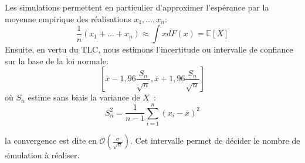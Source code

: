%
%	
%	
%	
%	
%	
%	
%	
%	
%	

\begin{f}
	
	Les simulations permettent en particulier d'approximer l'espérance par la moyenne empirique des réalisations $x_1,\ldots,x_n$:
	$$
	\frac{1}{n}(x_1+\ldots+x_n)\approx \int xdF(x)=\mathbb{E}[X]
	$$
	Ensuite, en vertu du TLC, nous estimons l'incertitude ou intervalle de confiance sur la base de la loi normale:
	$$
	\left[\overline{x}-1,96\frac{S_n}{\sqrt{n}},\overline{x}+1,96\frac{S_n}{\sqrt{n}}\right]
	$$
	où $S_n$ estime sans biais la variance de $X$~:
	$$
	S_n^2=\frac{1}{n-1}\sum_{i=1}^{n}(x_i-\overline{x})^2
	$$
	
	la convergence est dite en $\mathcal{O}(\frac{\sigma}{\sqrt{n}})$. 	
	Cet intervalle permet de décider le nombre de simulation à réaliser.
\end{f}

